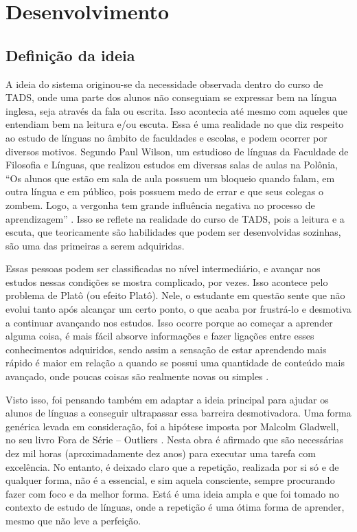 \chapter{Desenvolvimento}

\section{Definição da ideia}

A ideia do sistema originou-se da necessidade observada dentro do curso de TADS, onde uma parte dos alunos não conseguiam se expressar bem na língua inglesa, seja através da fala ou escrita. Isso acontecia até mesmo com aqueles que entendiam bem na leitura e/ou escuta. Essa é uma realidade no que diz respeito ao estudo de línguas no âmbito de faculdades e escolas, e podem ocorrer por diversos motivos. Segundo Paul Wilson, um estudioso de línguas da Faculdade de Filosofia e Línguas, que realizou estudos em diversas salas de aulas na Polônia, “Os alunos que estão em sala de aula possuem um bloqueio quando falam, em outra língua e em público, pois possuem medo de errar e que seus colegas o zombem. Logo, a vergonha tem grande influência negativa no processo de aprendizagem” . Isso se reflete na realidade do curso de TADS, pois a leitura e a escuta, que teoricamente são habilidades que podem ser desenvolvidas sozinhas, são uma das primeiras a serem adquiridas.

Essas pessoas podem ser classificadas no nível intermediário, e avançar nos estudos nessas condições se mostra complicado, por vezes. Isso acontece pelo problema de Platô (ou efeito Platô). Nele, o estudante em questão sente que não evolui tanto após alcançar um certo ponto, o que acaba por frustrá-lo e desmotiva a continuar avançando nos estudos. Isso ocorre porque ao começar a aprender alguma coisa, é mais fácil absorve informações e fazer ligações entre esses conhecimentos adquiridos, sendo assim a sensação de estar aprendendo mais rápido é maior em relação a quando se possui uma quantidade de conteúdo mais avançado, onde poucas coisas são realmente novas ou simples . 

Visto isso, foi pensando também em adaptar a ideia principal para ajudar os alunos de línguas a conseguir ultrapassar essa barreira desmotivadora. Uma forma genérica levada em consideração, foi a hipótese imposta por Malcolm Gladwell, no seu livro Fora de Série – Outliers . Nesta obra é afirmado que são necessárias dez mil horas (aproximadamente dez anos) para executar uma tarefa com excelência. No entanto, é deixado claro que a repetição, realizada por si só e de qualquer forma, não é a essencial, e sim aquela consciente, sempre procurando fazer com foco e da melhor forma. Está é uma ideia ampla e que foi tomado no contexto de estudo de línguas, onde a repetição é uma ótima forma de aprender, mesmo que não leve a perfeição.

